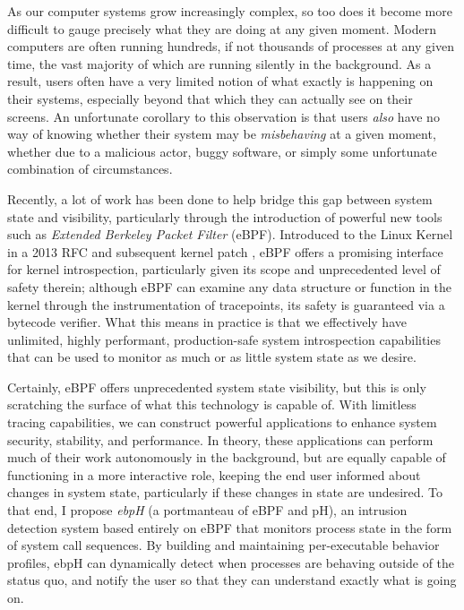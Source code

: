 \documentclass[
  12pt]{findlay}
\begin{document}
As our computer systems grow increasingly complex, so too does it become
more difficult to gauge precisely what they are doing at any given
moment. Modern computers are often running hundreds, if not thousands of
processes at any given time, the vast majority of which are running
silently in the background. As a result, users often have a very limited
notion of what exactly is happening on their systems, especially beyond
that which they can actually see on their screens. An unfortunate
corollary to this observation is that users \emph{also} have no way of
knowing whether their system may be \emph{misbehaving} at a given
moment, whether due to a malicious actor, buggy software, or simply some
unfortunate combination of circumstances.

Recently, a lot of work has been done to help bridge this gap between
system state and visibility, particularly through the introduction of
powerful new tools such as \emph{Extended Berkeley Packet Filter}
(eBPF). Introduced to the Linux Kernel in a 2013 RFC and subsequent
kernel patch \autocite{starovoitov13,starovoitov14}, eBPF offers a
promising interface for kernel introspection, particularly given its
scope and unprecedented level of safety therein; although eBPF can
examine any data structure or function in the kernel through the
instrumentation of tracepoints, its safety is guaranteed via a bytecode
verifier. What this means in practice is that we effectively have
unlimited, highly performant, production-safe system introspection
capabilities that can be used to monitor as much or as little system
state as we desire.

Certainly, eBPF offers unprecedented system state visibility, but this
is only scratching the surface of what this technology is capable of.
With limitless tracing capabilities, we can construct powerful
applications to enhance system security, stability, and performance. In
theory, these applications can perform much of their work autonomously
in the background, but are equally capable of functioning in a more
interactive role, keeping the end user informed about changes in system
state, particularly if these changes in state are undesired. To that
end, I propose \emph{ebpH} (a portmanteau of eBPF and pH), an intrusion
detection system based entirely on eBPF that monitors process state in
the form of system call sequences. By building and maintaining
per-executable behavior profiles, ebpH can dynamically detect when
processes are behaving outside of the status quo, and notify the user so
that they can understand exactly what is going on.
\end{document}
